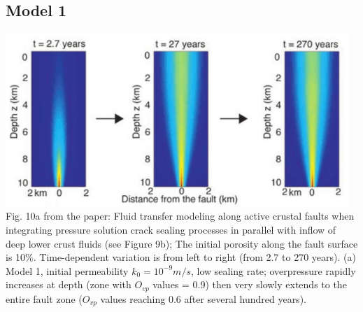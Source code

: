 \newpage
\subsection*{Model 1}

\begin{center}
\includegraphics[width=13cm]{python_codes/fieldstone_126/images/grfr03_10a}\\
{\captionfont Fig. 10a from the paper:
Fluid transfer modeling along active crustal faults when integrating pressure solution crack sealing
processes in parallel with inflow of deep lower crust fluids (see Figure 9b); 
The initial porosity along the fault surface is 10\%. Time-dependent
variation is from left to right (from 2.7 to 270 years). 
(a) Model 1, initial permeability $k_0 = 10^{-9} m/s$, low sealing rate; 
overpressure rapidly increases at depth (zone with $O_{vp}$ values = 0.9) then very 
slowly extends to the entire fault zone ($O_{vp}$ values reaching 0.6
after several hundred years). 
}
\end{center}


